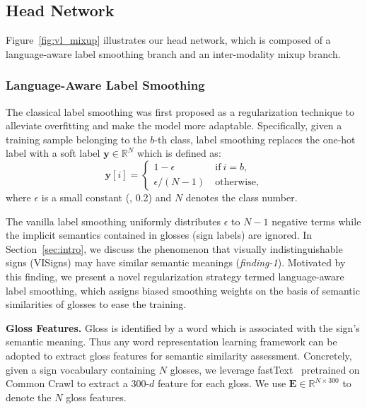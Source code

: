 \documentclass[10pt,twocolumn,letterpaper]{article}
\begin{document}
\subsection{Head Network}
\label{sec:head}
Figure~\ref{fig:vl_mixup} illustrates our head network, which is composed of a language-aware label smoothing branch and an inter-modality mixup branch.

\vspace{-4mm}
\subsubsection{Language-Aware Label Smoothing}
\vspace{-2mm}
\label{sec:lang_lbsm}
The classical label smoothing \cite{szegedy2016rethinking, he2019bag} was first proposed as a regularization technique to alleviate overfitting and make the model more adaptable.
Specifically, given a training sample belonging to the $b$-th class, label smoothing replaces the one-hot label with a soft label $\boldsymbol{y} \in \mathbb{R}^{N}$ which is defined as:
\begin{equation}
\label{equ:vani_lbsm}
\boldsymbol{y}[i]=
\begin{cases}
    1-\epsilon \ &\text{if}\  i=b, \\
    \epsilon/(N-1) \  &\text{otherwise},
\end{cases}
\end{equation}
where $\epsilon$ is a small constant (\eg, 0.2) and $N$ denotes the class number.

The vanilla label smoothing uniformly distributes $\epsilon$ to $N-1$ negative terms while the implicit semantics contained in glosses (sign labels) are ignored. In Section~\ref{sec:intro}, we discuss the phenomenon that visually indistinguishable signs (VISigns) may have similar semantic meanings (\textit{finding-1}). Motivated by this finding, we present a novel regularization strategy termed language-aware label smoothing, which assigns biased smoothing weights on the basis of semantic similarities of glosses to ease the training.

\noindent\textbf{Gloss Features.} Gloss is identified by a word which is associated with the sign’s semantic meaning. Thus any word representation learning framework can be adopted to extract gloss features for semantic similarity assessment. Concretely, given a sign vocabulary containing $N$ glosses, we leverage fastText~\cite{mikolov2018advances} pretrained on Common Crawl to extract a 300-$d$ feature for each gloss. We use $\boldsymbol{E}\in\mathbb{R}^{N \times 300}$ to denote the $N$ gloss features.
\end{document}
